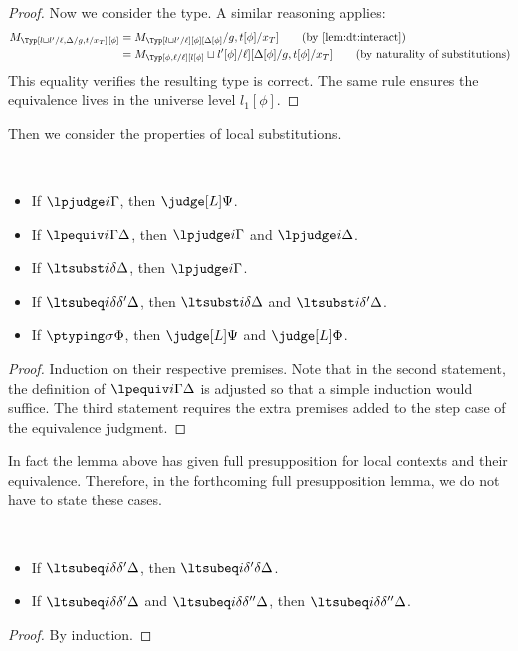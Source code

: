 \begin{proof}
  Now we consider the type. %
  A similar reasoning applies:
  \begin{align*}
    M_\Typ[l \sqcup l'/\ell, \Delta/g,t/x_T][\phi]
    &= M_\Typ[l \sqcup l'/\ell][\phi][\Delta[\phi]/g,t[\phi]/x_T]
      \tag{by \Cref{lem:dt:interact}} \\
    &= M_\Typ[\phi,\ell/\ell][l[\phi] \sqcup l'[\phi]/\ell][\Delta[\phi]/g,t[\phi]/x_T]
      \tag{by naturality of substitutions}
  \end{align*}
  This equality verifies the resulting type is correct. %
  The same rule ensures the equivalence lives in the universe level $l_1[\phi]$. 
\end{proof}

Then we consider the properties of local substitutions.
\begin{lemma} $ $
  \begin{itemize}
  \item If $\lpjudge i \Gamma$, then $\judge[L]\Psi$. 
  \item If $\lpequiv i \Gamma \Delta$, then $\lpjudge i \Gamma$ and $\lpjudge i
    \Delta$. 
  \item If $\ltsubst i \delta \Delta$, then $\lpjudge i \Gamma$. 
  \item If $\ltsubeq i{\delta}{\delta'}\Delta$, then $\ltsubst i \delta \Delta$ and
    $\ltsubst i{\delta'} \Delta$.
  \item If $\ptyping \sigma \Phi$, then $\judge[L]\Psi$ and $\judge[L]\Phi$.
  \end{itemize}
\end{lemma}
\begin{proof}
  Induction on their respective premises. Note that in the second statement, the
  definition of $\lpequiv i \Gamma \Delta$ is adjusted so that a simple induction
  would suffice. %
  The third statement requires the extra premises added to the step case of the equivalence judgment.
\end{proof}
In fact the lemma above has given full presupposition for local contexts and their
equivalence. %
Therefore, in the forthcoming full presupposition lemma, we do not have to state these
cases.

\begin{lemma} $ $
  \begin{itemize}
  \item If $\ltsubeq i{\delta}{\delta'}\Delta$, then $\ltsubeq i{\delta'}{\delta}\Delta$.
  \item If $\ltsubeq i{\delta}{\delta'}\Delta$ and $\ltsubeq
    i{\delta}{\delta''}\Delta$, then $\ltsubeq i{\delta}{\delta''}\Delta$.
  \end{itemize}
\end{lemma}
\begin{proof}
  By induction.
\end{proof}

